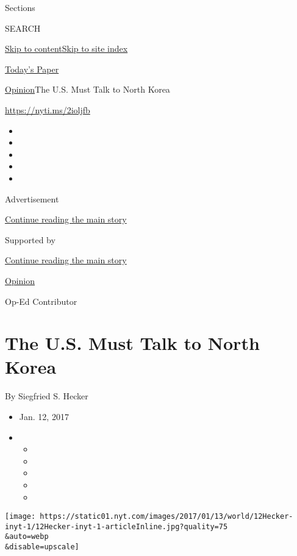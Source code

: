 Sections

SEARCH

\protect\hyperlink{site-content}{Skip to
content}\protect\hyperlink{site-index}{Skip to site index}

\href{https://myaccount.nytimes.com/auth/login?response_type=cookie\&client_id=vi}{}

\href{https://www.nytimes.com/section/todayspaper}{Today's Paper}

\href{/section/opinion}{Opinion}\textbar{}The U.S. Must Talk to North
Korea

\url{https://nyti.ms/2ioljfb}

\begin{itemize}
\item
\item
\item
\item
\item
\end{itemize}

Advertisement

\protect\hyperlink{after-top}{Continue reading the main story}

Supported by

\protect\hyperlink{after-sponsor}{Continue reading the main story}

\href{/section/opinion}{Opinion}

Op-Ed Contributor

\hypertarget{the-us-must-talk-to-north-korea}{%
\section{The U.S. Must Talk to North
Korea}\label{the-us-must-talk-to-north-korea}}

By Siegfried S. Hecker

\begin{itemize}
\item
  Jan. 12, 2017
\item
  \begin{itemize}
  \item
  \item
  \item
  \item
  \item
  \end{itemize}
\end{itemize}

\texttt{[image: https://static01.nyt.com/images/2017/01/13/world/12Hecker-inyt-1/12Hecker-inyt-1-articleInline.jpg?quality=75\\\&auto=webp\\\&disable=upscale]}

